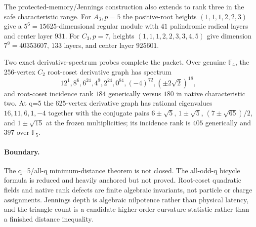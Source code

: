 The protected-memory/Jennings construction also extends to rank three in the safe characteristic range.  For $A_3,p=5$ the positive-root heights $(1,1,1,2,2,3)$ give a $5^6=15625$-dimensional regular module with $41$ palindromic radical layers and center layer $931$.  For $C_3,p=7$, heights $(1,1,1,2,2,3,3,4,5)$ give dimension $7^9=40353607$, $133$ layers, and center layer $925601$.

Two exact derivative-spectrum probes complete the packet.  Over genuine $\mathbb F_4$, the 256-vertex $C_2$ root-coset derivative graph has spectrum
\[
 12^1,8^6,6^{24},4^9,2^{24},0^{84},(-4)^{72},(\pm2\sqrt2)^{18},
\]
and root-coset incidence rank $184$ generically versus $180$ in native characteristic two.  At q=5 the 625-vertex derivative graph has rational eigenvalues $16,11,6,1,-4$ together with the conjugate pairs $6\pm\sqrt5$, $1\pm\sqrt5$, $(7\pm\sqrt{65})/2$, and $1\pm\sqrt{15}$ at the frozen multiplicities; its incidence rank is $405$ generically and $397$ over $\mathbb F_5$.

\paragraph{Boundary.}
The q=5/all-q minimum-distance theorem is not closed.  The all-odd-q bicycle formula is reduced and heavily anchored but not proved.  Root-coset quadratic fields and native rank defects are finite algebraic invariants, not particle or charge assignments.  Jennings depth is algebraic nilpotence rather than physical latency, and the triangle count is a candidate higher-order curvature statistic rather than a finished distance inequality.
\fi
